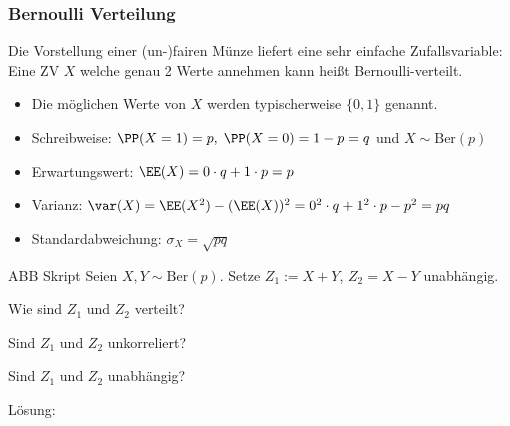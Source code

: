 \subsubsection{Bernoulli Verteilung}
Die Vorstellung einer (un-)fairen Münze liefert eine sehr einfache Zufallsvariable:
 Eine ZV $X$ welche genau 2 Werte annehmen kann heißt Bernoulli-verteilt.
\begin{itemize}
\item Die möglichen Werte von $X$ werden typischerweise $\{0,1\}$ genannt.
\item Schreibweise: $\PP(X=1)=p, \; \PP(X=0)=1-p=q$ und $X \sim \mathrm{Ber}(p)$
\item Erwartungswert: $\EE(X)=0\cdot q + 1 \cdot p = p$
\item Varianz: $\var (X) = \EE(X^2) - (\EE(X))^2 = 0^2 \cdot q + 1^2 \cdot p - p^2 = pq$
\item Standardabweichung: $\sigma_X=\sqrt{pq}$
\end{itemize}
ABB Skript
 Seien $X,Y \sim \mathrm{Ber}(p)$. Setze $Z_1:= X+Y$, $Z_2=X-Y$ unabhängig.
\begin{anumerate}
\item Wie sind $Z_1$ und $Z_2$ verteilt?
\item Sind $Z_1$ und $Z_2$ unkorreliert?
\item Sind $Z_1$ und $Z_2$ unabhängig?
\end{anumerate}
Lösung:
